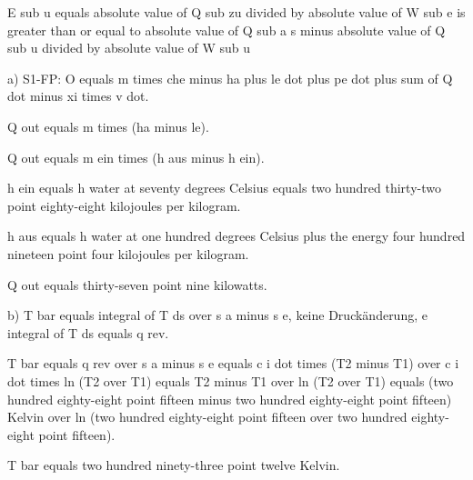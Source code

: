 E sub u equals absolute value of Q sub zu divided by absolute value of W sub e is greater than or equal to absolute value of Q sub a s minus absolute value of Q sub u divided by absolute value of W sub u

a) S1-FP: O equals m times che minus ha plus le dot plus pe dot plus sum of Q dot minus xi times v dot.

Q out equals m times (ha minus le).

Q out equals m ein times (h aus minus h ein).

h ein equals h water at seventy degrees Celsius equals two hundred thirty-two point eighty-eight kilojoules per kilogram.

h aus equals h water at one hundred degrees Celsius plus the energy four hundred nineteen point four kilojoules per kilogram.

Q out equals thirty-seven point nine kilowatts.

b) T bar equals integral of T ds over s a minus s e, keine Druckänderung, e integral of T ds equals q rev.

T bar equals q rev over s a minus s e equals c i dot times (T2 minus T1) over c i dot times ln (T2 over T1) equals T2 minus T1 over ln (T2 over T1) equals (two hundred eighty-eight point fifteen minus two hundred eighty-eight point fifteen) Kelvin over ln (two hundred eighty-eight point fifteen over two hundred eighty-eight point fifteen).

T bar equals two hundred ninety-three point twelve Kelvin.